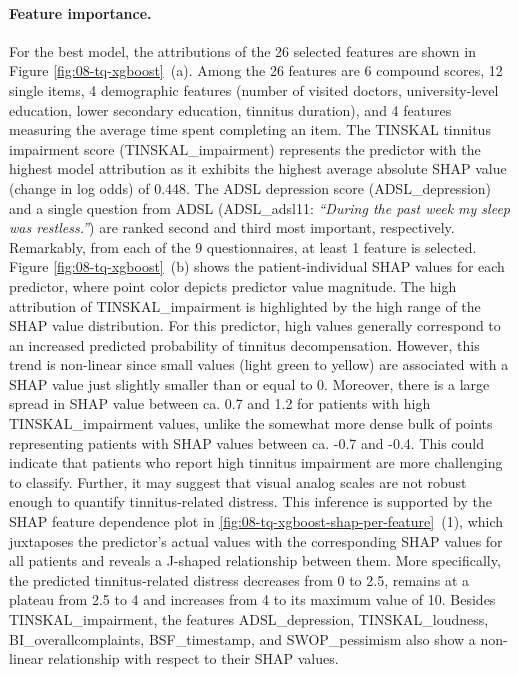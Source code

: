 \documentclass[
  oneside]{book}
\begin{document}
\paragraph*{Feature importance.}

For the best model, the attributions of the 26 selected features are shown in Figure \ref{fig:08-tq-xgboost}~(a).
Among the 26 features are 6 compound scores, 12 single items, 4 demographic features (number of visited doctors, university-level education, lower secondary education, tinnitus duration), and 4 features measuring the average time spent completing an item.
The TINSKAL tinnitus impairment score (TINSKAL\_impairment) represents the predictor with the highest model attribution as it exhibits the highest average absolute SHAP value (change in log odds) of 0.448.
The ADSL depression score (ADSL\_depression) and a single question from ADSL (ADSL\_adsl11: \emph{``During the past week my sleep was restless.''}) are ranked second and third most important, respectively.
Remarkably, from each of the 9 questionnaires, at least 1 feature is selected.
Figure \ref{fig:08-tq-xgboost}~(b) shows the patient-individual SHAP values for each predictor, where point color depicts predictor value magnitude.
The high attribution of TINSKAL\_impairment is highlighted by the high range of the SHAP value distribution.
For this predictor, high values generally correspond to an increased predicted probability of tinnitus decompensation.
However, this trend is non-linear since small values (light green to yellow) are associated with a SHAP value just slightly smaller than or equal to 0.
Moreover, there is a large spread in SHAP value between ca. 0.7 and 1.2 for patients with high TINSKAL\_impairment values, unlike the somewhat more dense bulk of points representing patients with SHAP values between ca. -0.7 and -0.4.
This could indicate that patients who report high tinnitus impairment are more challenging to classify.
Further, it may suggest that visual analog scales are not robust enough to quantify tinnitus-related distress.
This inference is supported by the SHAP feature dependence plot in \ref{fig:08-tq-xgboost-shap-per-feature}~(1), which juxtaposes the predictor's actual values with the corresponding SHAP values for all patients and reveals a J-shaped relationship between them.
More specifically, the predicted tinnitus-related distress decreases from 0 to 2.5, remains at a plateau from 2.5 to 4 and increases from 4 to its maximum value of 10.
Besides TINSKAL\_impairment, the features ADSL\_depression, TINSKAL\_loudness, BI\_overallcomplaints, BSF\_timestamp, and SWOP\_pessimism also show a non-linear relationship with respect to their SHAP values.
\end{document}
